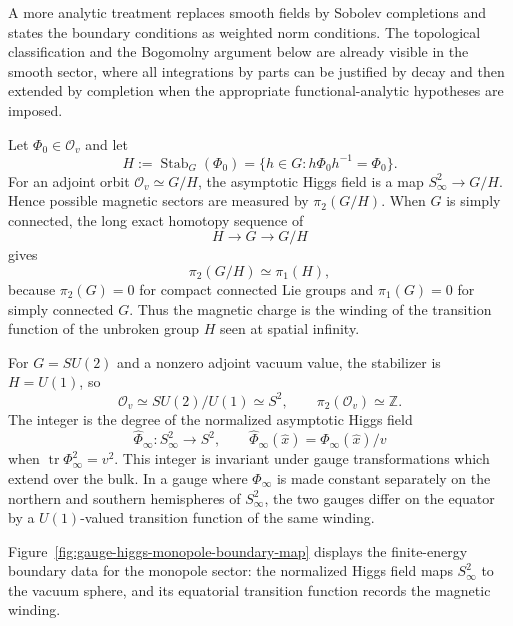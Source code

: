 A more analytic treatment replaces smooth fields by Sobolev completions and
states the boundary conditions as weighted norm conditions.  The topological
classification and the Bogomolny argument below are already visible in the
smooth sector, where all integrations by parts can be justified by decay and
then extended by completion when the appropriate functional-analytic
hypotheses are imposed.

Let \(\Phi_0\in\mathcal O_v\) and let
\[
  H:=\operatorname{Stab}_G(\Phi_0)
  =
  \{h\in G:h\Phi_0h^{-1}=\Phi_0\}.
\]
For an adjoint orbit \(\mathcal O_v\simeq G/H\), the asymptotic Higgs field is
a map \(S^2_\infty\to G/H\).  Hence possible magnetic sectors are measured by
\(\pi_2(G/H)\).  When \(G\) is simply connected, the long exact homotopy
sequence of
\[
  H\longrightarrow G\longrightarrow G/H
\]
gives
\[
  \pi_2(G/H)\simeq \pi_1(H),
\]
because \(\pi_2(G)=0\) for compact connected Lie groups and
\(\pi_1(G)=0\) for simply connected \(G\).  Thus the magnetic charge is the
winding of the transition function of the unbroken group \(H\) seen at
spatial infinity.

\begin{example}[\(SU(2)\to U(1)\)]
\label{ex:su2-to-u1-monopole-sector}
For \(G=SU(2)\) and a nonzero adjoint vacuum value, the stabilizer is
\(H=U(1)\), so
\[
  \mathcal O_v\simeq SU(2)/U(1)\simeq S^2,
  \qquad
  \pi_2(\mathcal O_v)\simeq \mathbb Z .
\]
The integer is the degree of the normalized asymptotic Higgs field
\[
  \widehat\Phi_\infty:S^2_\infty\to S^2,
  \qquad
  \widehat\Phi_\infty(\hat x)=\Phi_\infty(\hat x)/v
\]
when \(\operatorname{tr}\Phi_\infty^2=v^2\).  This integer is invariant under
gauge transformations which extend over the bulk.  In a gauge where
\(\Phi_\infty\) is made constant separately on the
northern and southern hemispheres of \(S^2_\infty\), the two gauges differ on
the equator by a \(U(1)\)-valued transition function of the same winding.
\end{example}

Figure~\ref{fig:gauge-higgs-monopole-boundary-map} displays the finite-energy
boundary data for the monopole sector: the normalized Higgs field maps
\(S^2_\infty\) to the vacuum sphere, and its equatorial transition function
records the magnetic winding.

